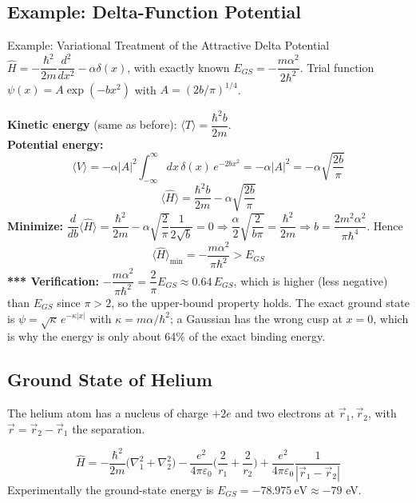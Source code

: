 \documentclass[11pt,a4paper]{article}
\begin{document}
\subsection{Example: Delta-Function Potential}
\begin{prob}{Example: Variational Treatment of the Attractive Delta Potential}
$\hat H = -\dfrac{\hbar^2}{2m}\dfrac{d^2}{dx^2} - \alpha\delta(x)$, with exactly known $E_{GS} = -\dfrac{m\alpha^2}{2\hbar^2}$. Trial function $\psi(x) = A\exp(-bx^2)$ with $A = (2b/\pi)^{1/4}$.

\textbf{Kinetic energy} (same as before): $\langle T\rangle = \dfrac{\hbar^2b}{2m}$.\\
\textbf{Potential energy:}
\[
\langle V\rangle = -\alpha|A|^2\int_{-\infty}^{\infty}dx\,\delta(x)\,e^{-2bx^2} = -\alpha|A|^2 = -\alpha\sqrt{\frac{2b}{\pi}}
\]
\[
\langle\hat H\rangle = \frac{\hbar^2b}{2m} - \alpha\sqrt{\frac{2b}{\pi}}
\]
\textbf{Minimize:} $\dfrac{d}{db}\langle\hat H\rangle = \dfrac{\hbar^2}{2m} - \alpha\sqrt{\dfrac2\pi}\dfrac1{2\sqrt b} = 0 \Rightarrow \dfrac\alpha2\sqrt{\dfrac{2}{b\pi}} = \dfrac{\hbar^2}{2m}\Rightarrow b = \dfrac{2m^2\alpha^2}{\pi\hbar^4}$. Hence
\[
\boxed{\langle\hat H\rangle_{\min} = -\frac{m\alpha^2}{\pi\hbar^2} > E_{GS}}
\]
\textbf{*** Verification:} $-\dfrac{m\alpha^2}{\pi\hbar^2} = \dfrac2\pi E_{GS}\approx0.64\,E_{GS}$, which is higher (less negative) than $E_{GS}$ since $\pi>2$, so the upper-bound property holds. The exact ground state is $\psi=\sqrt\kappa\,e^{-\kappa|x|}$ with $\kappa=m\alpha/\hbar^2$; a Gaussian has the wrong cusp at $x=0$, which is why the energy is only about 64\% of the exact binding energy.
\end{prob}

\subsection{Ground State of Helium}
The helium atom has a nucleus of charge $+2e$ and two electrons at $\vec r_1,\vec r_2$, with $\vec r = \vec r_2-\vec r_1$ the separation.
\begin{center}
\end{center}
\[
\hat H = -\frac{\hbar^2}{2m}\big(\nabla_1^2+\nabla_2^2\big) - \frac{e^2}{4\pi\varepsilon_0}\Big(\frac2{r_1}+\frac2{r_2}\Big) + \frac{e^2}{4\pi\varepsilon_0}\frac1{|\vec r_1-\vec r_2|}
\]
Experimentally the ground-state energy is $E_{GS} = -78.975\ \text{eV}\approx -79$ eV.
\end{document}
